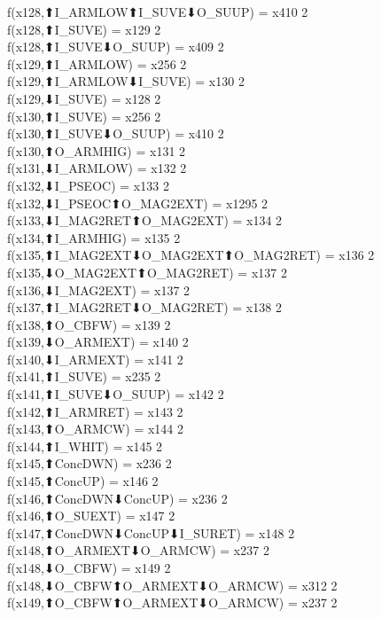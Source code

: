 f(x128,⬆I_ARMLOW⬆I_SUVE⬇O_SUUP) = x410 {2} \\
f(x128,⬆I_SUVE) = x129 {2} \\
f(x128,⬆I_SUVE⬇O_SUUP) = x409 {2} \\
f(x129,⬆I_ARMLOW) = x256 {2} \\
f(x129,⬆I_ARMLOW⬇I_SUVE) = x130 {2} \\
f(x129,⬇I_SUVE) = x128 {2} \\
f(x130,⬆I_SUVE) = x256 {2} \\
f(x130,⬆I_SUVE⬇O_SUUP) = x410 {2} \\
f(x130,⬆O_ARMHIG) = x131 {2} \\
f(x131,⬇I_ARMLOW) = x132 {2} \\
f(x132,⬇I_PSEOC) = x133 {2} \\
f(x132,⬇I_PSEOC⬆O_MAG2EXT) = x1295 {2} \\
f(x133,⬇I_MAG2RET⬆O_MAG2EXT) = x134 {2} \\
f(x134,⬆I_ARMHIG) = x135 {2} \\
f(x135,⬆I_MAG2EXT⬇O_MAG2EXT⬆O_MAG2RET) = x136 {2} \\
f(x135,⬇O_MAG2EXT⬆O_MAG2RET) = x137 {2} \\
f(x136,⬇I_MAG2EXT) = x137 {2} \\
f(x137,⬆I_MAG2RET⬇O_MAG2RET) = x138 {2} \\
f(x138,⬆O_CBFW) = x139 {2} \\
f(x139,⬇O_ARMEXT) = x140 {2} \\
f(x140,⬇I_ARMEXT) = x141 {2} \\
f(x141,⬆I_SUVE) = x235 {2} \\
f(x141,⬆I_SUVE⬇O_SUUP) = x142 {2} \\
f(x142,⬆I_ARMRET) = x143 {2} \\
f(x143,⬆O_ARMCW) = x144 {2} \\
f(x144,⬆I_WHIT) = x145 {2} \\
f(x145,⬆ConcDWN) = x236 {2} \\
f(x145,⬆ConcUP) = x146 {2} \\
f(x146,⬆ConcDWN⬇ConcUP) = x236 {2} \\
f(x146,⬆O_SUEXT) = x147 {2} \\
f(x147,⬆ConcDWN⬇ConcUP⬇I_SURET) = x148 {2} \\
f(x148,⬆O_ARMEXT⬇O_ARMCW) = x237 {2} \\
f(x148,⬇O_CBFW) = x149 {2} \\
f(x148,⬇O_CBFW⬆O_ARMEXT⬇O_ARMCW) = x312 {2} \\
f(x149,⬆O_CBFW⬆O_ARMEXT⬇O_ARMCW) = x237 {2} \\
